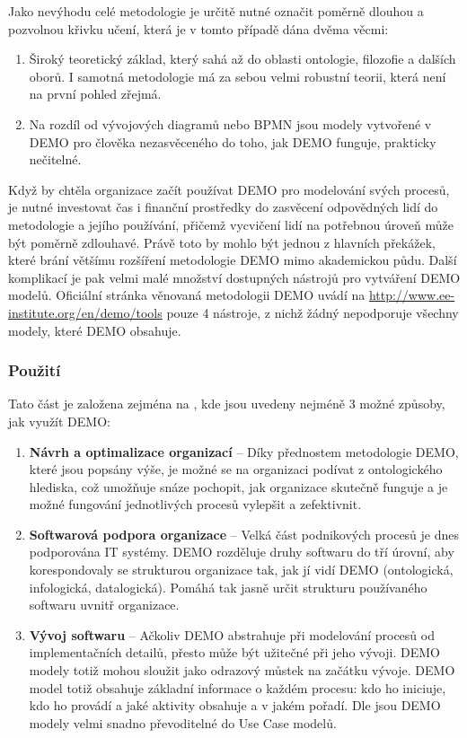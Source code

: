 Jako nevýhodu celé metodologie je určitě nutné označit poměrně dlouhou a pozvolnou křivku učení, která je v tomto případě dána dvěma věcmi:

\begin{enumerate}
\item Široký teoretický základ, který sahá až do oblasti ontologie, filozofie a dalších oborů. I samotná metodologie má za sebou velmi robustní teorii, která není na první pohled zřejmá.
\item Na rozdíl od vývojových diagramů nebo BPMN jsou modely vytvořené v DEMO pro člověka nezasvěceného do toho, jak DEMO funguje, prakticky nečitelné.
\end{enumerate}

Když by chtěla organizace začít používat DEMO pro modelování svých procesů, je nutné investovat čas i finanční prostředky do zasvěcení odpovědných lidí do metodologie a jejího používání, přičemž vycvičení lidí na potřebnou úroveň může být poměrně zdlouhavé. Právě toto by mohlo být jednou z hlavních překážek, které brání většímu rozšíření metodologie DEMO mimo akademickou půdu. Další komplikací je pak velmi malé množství dostupných nástrojů pro vytváření DEMO modelů. Oficiální stránka věnovaná metodologii DEMO uvádí na \url{http://www.ee-institute.org/en/demo/tools} pouze 4 nástroje, z nichž žádný nepodporuje všechny modely, které DEMO obsahuje.

\subsubsection{Použití}
Tato část je založena zejména na \cite{Vejrazkova2012}, kde jsou uvedeny nejméně 3 možné způsoby, jak využít DEMO:

\begin{enumerate}
\item \textbf{Návrh a optimalizace organizací} – Díky přednostem metodologie DEMO, které jsou popsány výše, je možné se na organizaci podívat z ontologického hlediska, což umožňuje snáze pochopit, jak organizace skutečně funguje a je možné fungování jednotlivých procesů vylepšit a zefektivnit.
\item \textbf{Softwarová podpora organizace} – Velká část podnikových procesů je dnes podporována IT systémy. DEMO rozděluje druhy softwaru do tří úrovní, aby korespondovaly se strukturou organizace tak, jak jí vidí DEMO (ontologická, infologická, datalogická). Pomáhá tak jasně určit strukturu používaného softwaru uvnitř organizace. %
\item \textbf{Vývoj softwaru} – Ačkoliv DEMO abstrahuje při modelování procesů od implementačních detailů, přesto může být užitečné při jeho vývoji. DEMO modely totiž mohou sloužit jako odrazový můstek na začátku vývoje. DEMO model totiž obsahuje základní informace o každém procesu: kdo ho iniciuje, kdo ho provádí a jaké aktivity obsahuje a v jakém pořadí. Dle \cite{Shishkov2005} jsou DEMO modely velmi snadno převoditelné do Use Case modelů.
\end{enumerate}



